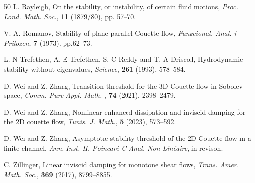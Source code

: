 \documentclass[11pt,reqno]{article}
\numberwithin{equation}{section}
\begin{document}
\begin{thebibliography}{50}
	L. Rayleigh, On the stability, or instability, of certain fluid motions, \textit{Proc. Lond. Math. Soc.}, \textbf{11} (1879/80), pp. 57--70.


	V. A. Romanov, Stability of plane-parallel Couette flow, \textit{Funkcional. Anal. i Prilozen}, \textbf{7} (1973),
pp.62–73.



 L. N Trefethen, A. E Trefethen, S. C Reddy and T. A Driscoll, Hydrodynamic stability without
eigenvalues, \textit{Science}, \textbf{261} (1993),  578--584.


D. Wei and Z. Zhang,  Transition threshold for the 3D Couette flow in Sobolev space, \textit{Comm. Pure Appl. Math. }, \textbf{74} (2021), 2398–2479.

D. Wei and Z. Zhang, Nonlinear enhanced dissipation and inviscid damping for the 2D couette flow, \textit{Tunis.
	J. Math.}, \textbf{5} (2023), 573–592.

 D. Wei and Z. Zhang, Asymptotic stability threshold of the 2D Couette flow in a finite channel,   \textit{Ann. Inst. H.
	Poincaré C Anal. Non Linéaire}, in revison.

C. Zillinger,
Linear inviscid damping for monotone shear flows,
\textit{Trans. Amer. Math. Soc.}, \textbf{369} (2017), 8799--8855.




\end{thebibliography}
\end{document}
